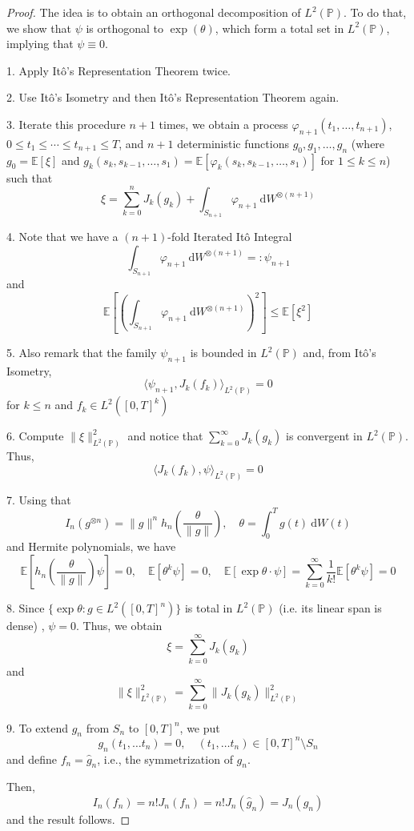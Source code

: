 \begin{proof}
    The idea is to obtain an orthogonal decomposition of $L^2(\mathbb{P})$. To do that, we show that $\psi$ is orthogonal to $\exp(\theta)$, which form a total set in $L^2(\mathbb{P})$, implying that $\psi \equiv 0$.

    1. Apply Itô's Representation Theorem twice.

    2. Use Itô's Isometry and then Itô's Representation Theorem again.

    3. Iterate this procedure $n+1$ times, we obtain a process $\varphi_{n+1}(t_1, \ldots, t_{n+1})$, $0 \le t_1 \le \cdots \le t_{n+1} \le T$, and $n+1$ deterministic functions $g_0, g_1, \ldots, g_n$ (where $g_0 = \mathbb{E}[\xi]$ and $g_k(s_k, s_{k-1}, \ldots, s_1) = \mathbb{E}[\varphi_k(s_k, s_{k-1}, \ldots, s_1)]$ for $1 \le k \le n$) such that 
        $$
        \xi = \sum_{k=0}^n J_k(g_k) + \int_{S_{n+1}} \varphi_{n+1} ~\mathrm{d}W^{\otimes(n+1)}
        $$

    4. Note that we have a $(n+1)$-fold Iterated Itô Integral
        $$
        \int_{S_{n+1}} \varphi_{n+1} ~\mathrm{d}W^{\otimes(n+1)} =: \psi_{n+1}
        $$
        and 
        $$
        \mathbb{E} \left[ \left( \int_{S_{n+1}} \varphi_{n+1} ~\mathrm{d}W^{\otimes(n+1)} \right)^2 \right] \le \mathbb{E}[\xi^2]
        $$

    5. Also remark that the family $\psi_{n+1}$ is bounded in $L^2(\mathbb{P})$ and, from Itô's Isometry,
        $$
        \langle \psi_{n+1}, J_k(f_k) \rangle_{L^2(\mathbb{P})} = 0
        $$
        for $k \le n$ and $f_k \in L^2([0,T]^k)$

    6. Compute $\| \xi \|_{L^2(\mathbb{P})}^2$ and notice that $\sum_{k=0}^\infty J_k(g_k)$ is convergent in $L^2(\mathbb{P})$. Thus,
        $$
        \langle J_k(f_k), \psi \rangle_{L^2(\mathbb{P})} = 0
        $$

    7. Using that
    $$
    I_n(g^{\otimes n}) = \| g \|^n h_n \left(\frac{\theta}{\| g \|} \right), \quad \theta = \int_0^T g(t) ~\mathrm{d}W(t)
    $$
    and Hermite polynomials, we have
    $$
        \mathbb{E} \left[ h_n \left(\frac{\theta}{\| g \|} \right) \psi \right] = 0, \quad 
        \mathbb{E} \left[ \theta^k \psi \right] = 0, \quad \mathbb{E} \left[ \exp \theta \cdot \psi \right] = \sum_{k=0}^\infty \frac{1}{k!} \mathbb{E} \left[ \theta^k \psi \right] = 0
    $$

    8. Since $\{ \exp \theta : g \in L^2([0,T]^n) \}$ is total in $L^2(\mathbb{P})$ (i.e. its linear span is dense) \cite[Lemma 4.3.2]{oksendal2013stochastic}, $\psi = 0$. Thus, we obtain 
        $$
        \xi = \sum_{k=0}^\infty J_k(g_k)
        $$
        and
        $$
        \| \xi \|_{L^2(\mathbb{P})}^2 = \sum_{k=0}^\infty \| J_k(g_k) \|_{L^2(\mathbb{P})}^2
        $$

    9. To extend $g_n$ from $S_n$ to $[0,T]^n$, we put 
        $$
        g_n(t_1, \ldots t_n) = 0, \quad (t_1, \ldots t_n) \in [0,T]^n \setminus S_n
        $$
        and define $f_n = \hat{g}_n$, i.e., the symmetrization of $g_n$.

        Then, 
        $$
        I_n(f_n) = n! J_n(f_n) = n! J_n(\hat{g}_n) = J_n(g_n)
        $$
        and the result follows.
\end{proof}
